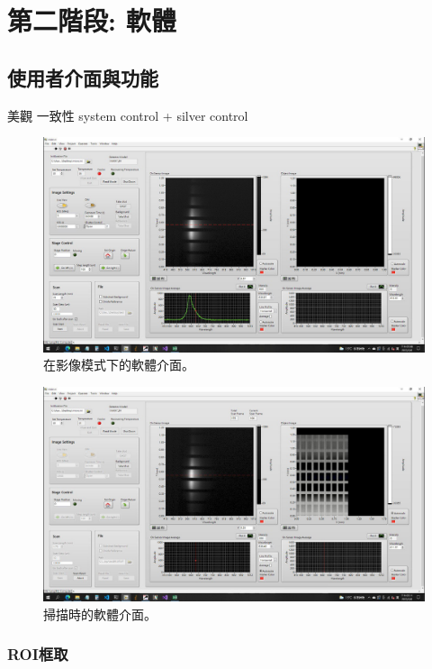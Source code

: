 \documentclass[12pt]{article}
\begin{document}
    \section{第二階段: 軟體}
    \subsection{使用者介面與功能}
    美觀 一致性 system control + silver control
    \begin{figure}
        \centering
        \includegraphics[width=\linewidth]{acquire.jpeg}
        \caption{在影像模式下的軟體介面。}
        \label{figure: acquire mode}
    \end{figure}
    \begin{figure}
        \centering
        \includegraphics[width=\linewidth]{scanning.jpeg}
        \caption{掃描時的軟體介面。}
        \label{figure: scanning}
    \end{figure}
    \subsubsection{ROI框取}
\end{document}
